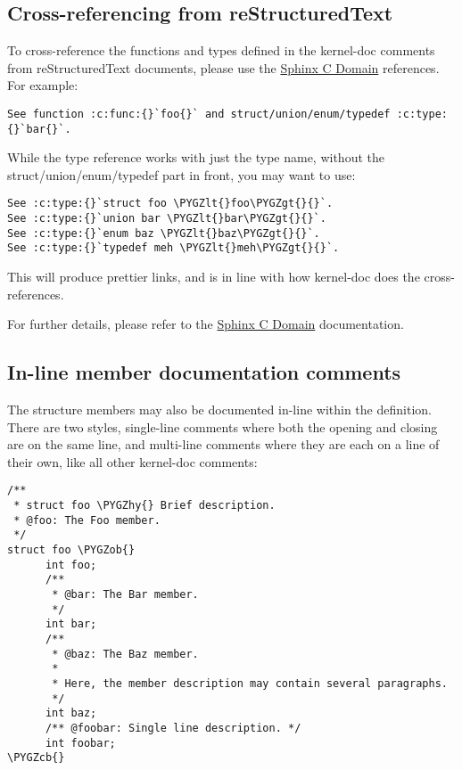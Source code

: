 \documentclass[a4paper,8pt,english]{sphinxmanual}
\def\PYGZob{\char`\{}
\def\PYGZcb{\char`\}}
\def\PYGZlt{\char`\<}
\def\PYGZgt{\char`\>}
\def\PYGZhy{\char`\-}
\begin{document}
\subsection{Cross-referencing from reStructuredText}
\label{doc-guide/kernel-doc:cross-referencing-from-restructuredtext}
To cross-reference the functions and types defined in the kernel-doc comments
from reStructuredText documents, please use the \href{http://www.sphinx-doc.org/en/stable/domains.html}{Sphinx C Domain}
references. For example:

\begin{Verbatim}[commandchars=\\\{\}]
See function :c:func:{}`foo{}` and struct/union/enum/typedef :c:type:{}`bar{}`.
\end{Verbatim}

While the type reference works with just the type name, without the
struct/union/enum/typedef part in front, you may want to use:

\begin{Verbatim}[commandchars=\\\{\}]
See :c:type:{}`struct foo \PYGZlt{}foo\PYGZgt{}{}`.
See :c:type:{}`union bar \PYGZlt{}bar\PYGZgt{}{}`.
See :c:type:{}`enum baz \PYGZlt{}baz\PYGZgt{}{}`.
See :c:type:{}`typedef meh \PYGZlt{}meh\PYGZgt{}{}`.
\end{Verbatim}

This will produce prettier links, and is in line with how kernel-doc does the
cross-references.

For further details, please refer to the \href{http://www.sphinx-doc.org/en/stable/domains.html}{Sphinx C Domain} documentation.


\subsection{In-line member documentation comments}
\label{doc-guide/kernel-doc:in-line-member-documentation-comments}
The structure members may also be documented in-line within the definition.
There are two styles, single-line comments where both the opening \code{/**} and
closing \code{*/} are on the same line, and multi-line comments where they are each
on a line of their own, like all other kernel-doc comments:

\begin{Verbatim}[commandchars=\\\{\}]
/**
 * struct foo \PYGZhy{} Brief description.
 * @foo: The Foo member.
 */
struct foo \PYGZob{}
      int foo;
      /**
       * @bar: The Bar member.
       */
      int bar;
      /**
       * @baz: The Baz member.
       *
       * Here, the member description may contain several paragraphs.
       */
      int baz;
      /** @foobar: Single line description. */
      int foobar;
\PYGZcb{}
\end{Verbatim}
\end{document}
